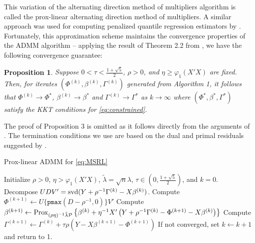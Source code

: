 \documentclass[12pt]{article}
\newtheorem{prop}{Proposition}
\begin{document}
This variation of the alternating direction method of multipliers algorithm is called the prox-linear alternating direction method of multipliers. A similar approach was used for computing penalized quantile regression estimators by \citet{gu2018admm}. Fortunately, this approximation scheme maintains the convergence properties of the ADMM algorithm -- applying the result of Theorem 2.2 from \citet{deng2016global}, we have the following convergence guarantee:
\begin{prop}\citep{deng2016global}
Suppose $0 < \tau < \frac{1 + \sqrt{5}}{2}$, $\rho > 0$, and $\eta \geq \varphi_{1}(X'X)$ are fixed. Then, for iterates $(\Phi^{(k)}, \beta^{(k)}, \Gamma^{(k)})$ generated from Algorithm 1, it follows that $\Phi^{(k)} \to \Phi^*$, $\beta^{(k)} \to \beta^{*}$ and $\Gamma^{(k)} \to \Gamma^{*}$ as $k \to \infty$ where $(\Phi^{*}, \beta^{*}, \Gamma^{*})$ satisfy the KKT conditions for \eqref{eq:constrained}.
\end{prop}\label{conv_prop}
The proof of Proposition 3 is omitted as it follows directly from the arguments of \citet{deng2016global}. 
The termination conditions we use are based on the dual and primal residuals suggested by \citet{boyd2011distributed}.

\begin{algorithm}[t!]
\caption{Prox-linear ADMM for \eqref{eq:MSRL}}
\begin{spacing}{1.15}
\begin{algorithmic}[1]
\Require Initialize $\rho > 0$, $\eta > \varphi_1(X'X)$, $\tilde{\lambda} = \sqrt{n}\lambda$, $\tau \in (0, \frac{1 + \sqrt{5}}{2})$, and $k=0$.
\State Decompose $UDV' = {\rm svd}(Y + \rho^{-1}\Gamma^{(k)} - X\beta^{(k)})$. 
\State Compute $\Phi^{(k+1)} \leftarrow U \{ \texttt{pmax}(D - \rho^{-1}, 0) \} V'$
\State Compute $\beta^{(k+1)} \leftarrow {\rm Prox}_{(\rho \eta)^{-1}\tilde{\lambda} \mathcal{P}} \left\{ \beta^{(k)} + \eta^{-1} X'\left(Y + \rho^{-1} \Gamma^{(k)} - \Phi^{(k+1)} - X\beta^{(k)}\right)\right\}$
\State Compute $\Gamma^{(k+1)} \leftarrow \Gamma^{(k)} + \tau \rho(Y - X\beta^{(k+1)} - \Phi^{(k+1)})$
\State If not converged, set $k \leftarrow k + 1$ and return to 1. 
\end{algorithmic}
\end{spacing}
\end{algorithm}
\end{document}
